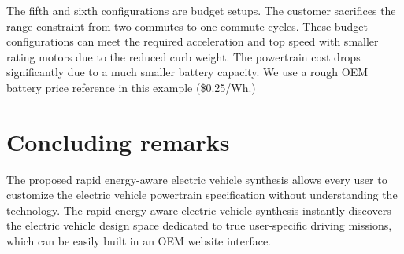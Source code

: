 \documentclass[journal]{IEEEtran}
\begin{document}
The fifth and sixth configurations are budget setups. The customer sacrifices the range constraint from two commutes to one-commute cycles. These budget configurations can meet the required acceleration and top speed with smaller rating motors due to the reduced curb weight. The powertrain cost drops significantly due to a much smaller battery capacity. We use a rough OEM battery price reference in this example (\$0.25/Wh.)



\section{Concluding remarks}

The proposed rapid energy-aware electric vehicle synthesis allows every user to customize the electric vehicle powertrain specification without understanding the technology. The rapid energy-aware electric vehicle synthesis instantly discovers the electric vehicle design space dedicated to true user-specific driving missions, which can be easily built in an OEM website interface. 








%
%

\end{document}

